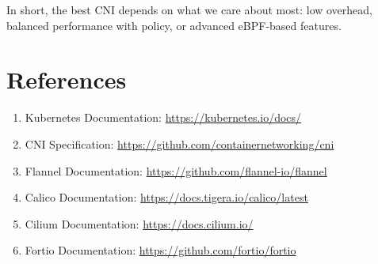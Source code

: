 \documentclass[12pt,a4paper]{article}
\begin{document}
In short, the best CNI depends on what we care about most: low overhead, balanced performance with policy, or advanced eBPF-based features.

\section{References}
\begin{enumerate}[leftmargin=1.8em]
    \item Kubernetes Documentation: \url{https://kubernetes.io/docs/}
    \item CNI Specification: \url{https://github.com/containernetworking/cni}
    \item Flannel Documentation: \url{https://github.com/flannel-io/flannel}
    \item Calico Documentation: \url{https://docs.tigera.io/calico/latest}
    \item Cilium Documentation: \url{https://docs.cilium.io/}
    \item Fortio Documentation: \url{https://github.com/fortio/fortio}
\end{enumerate}
\end{document}
